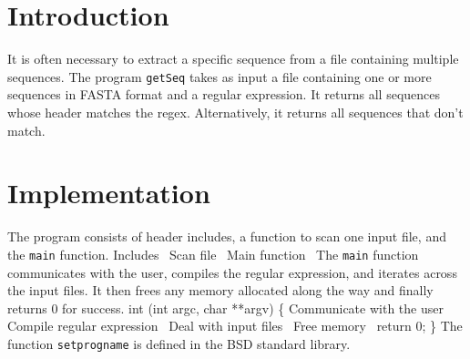 \nwfilename{}\nwenddocs{}\nwdocspar%
\section{Introduction}
It is often necessary to extract a specific sequence from a file
containing multiple sequences. The program \texttt{getSeq} takes as
input a file containing one or more sequences in FASTA format and a
regular expression. It returns all sequences whose header matches the
regex. Alternatively, it returns all sequences that don't match.
\section{Implementation}
The program consists of header includes, a function to scan one input
file, and the \texttt{main} function.
\nwenddocs{}\endmoddef\nwstartdeflinemarkup\nwenddeflinemarkup
\LA{}Includes~{\nwtagstyle{}}\RA{}
\LA{}Scan file~{\nwtagstyle{}}\RA{}
\LA{}Main function~{\nwtagstyle{}}\RA{}
\nwendcode{}\nwdocspar
The \texttt{main} function communicates with the user, compiles the
regular expression, and iterates across the input files. It then frees
any memory allocated along the way and finally returns 0 for success.
\nwenddocs{}\endmoddef\nwstartdeflinemarkup{}\nwenddeflinemarkup
int (int argc, char **argv) \{
  \LA{}Communicate with the user~{\nwtagstyle{}}\RA{}
  \LA{}Compile regular expression~{\nwtagstyle{}}\RA{}
  \LA{}Deal with input files~{\nwtagstyle{}}\RA{}
  \LA{}Free memory~{\nwtagstyle{}}\RA{}
  return 0;
\}
\nwendcode{}\nwdocspar
The function \texttt{setprogname} is defined in the BSD standard
library.
\nwenddocs{}\endmoddef\nwstartdeflinemarkup{}\nwenddeflinemarkup

